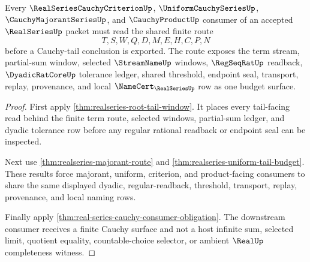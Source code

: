 \begin{theorem}
\label{thm:realseries-root-cauchy-tail-budget}
Every $\RealSeriesCauchyCriterionUp$, $\UniformCauchySeriesUp$, $\CauchyMajorantSeriesUp$, and $\CauchyProductUp$ consumer of an accepted $\RealSeriesUp$ packet must read the shared finite route
$$
T,S,W,Q,D,M,E,H,C,P,N
$$
before a Cauchy-tail conclusion is exported. The route exposes the term stream, partial-sum window, selected $\StreamNameUp$ windows, $\RegSeqRatUp$ readback, $\DyadicRatCoreUp$ tolerance ledger, shared threshold, endpoint seal, transport, replay, provenance, and local $\NameCert_{\RealSeriesUp}$ row as one budget surface.
\end{theorem}
\begin{proof}
First apply \autoref{thm:realseries-root-tail-window}. It places every tail-facing read behind the finite term route, selected windows, partial-sum ledger, and dyadic tolerance row before any regular rational readback or endpoint seal can be inspected.

Next use \autoref{thm:realseries-majorant-route} and \autoref{thm:realseries-uniform-tail-budget}. These results force majorant, uniform, criterion, and product-facing consumers to share the same displayed dyadic, regular-readback, threshold, transport, replay, provenance, and local naming rows.

Finally apply \autoref{thm:real-series-cauchy-consumer-obligation}. The downstream consumer receives a finite Cauchy surface and not a host infinite sum, selected limit, quotient equality, countable-choice selector, or ambient $\RealUp$ completeness witness.
\end{proof}


